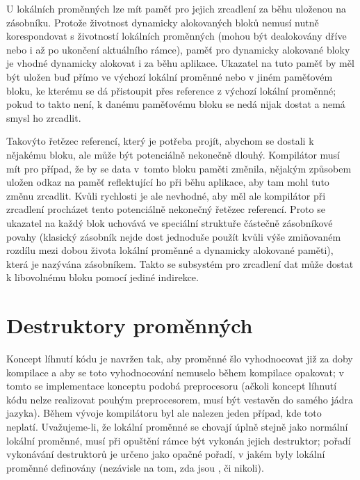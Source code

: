 U lokálních \ctime proměnných lze mít paměť pro jejich zrcadlení za běhu uloženou na zásobníku. Protože životnost dynamicky alokovaných \ctime bloků nemusí nutně korespondovat s životností lokálních proměnných (mohou být dealokovány dříve nebo i až po ukončení aktuálního rámce), paměť pro dynamicky alokované \ctime bloky je vhodné dynamicky alokovat i za běhu aplikace. Ukazatel na tuto paměť by měl být uložen buď přímo ve výchozí \ctime lokální proměnné nebo v jiném paměťovém bloku, ke kterému se dá přistoupit přes reference z výchozí lokální proměnné; pokud to takto není, k danému paměťovému bloku se nedá nijak dostat a nemá smysl ho zrcadlit.

Takovýto řetězec referencí, který je potřeba projít, abychom se dostali k nějakému bloku, ale může být potenciálně nekonečně dlouhý. Kompilátor musí mít pro případ, že by se data v~tomto \ctime bloku paměti změnila, nějakým způsobem uložen odkaz na paměť reflektující ho při běhu aplikace, aby tam mohl tuto změnu zrcadlit. Kvůli rychlosti je ale nevhodné, aby měl ale kompilátor při zrcadlení procházet tento potenciálně nekonečný řetězec referencí. Proto se ukazatel na každý blok uchovává ve speciální struktuře částečně zásobníkové povahy (klasický zásobník nejde dost jednoduše použít kvůli výše zmiňovaném rozdílu mezi dobou života lokální proměnné a dynamicky alokované \ctime paměti), která je nazývána \ctime zásobníkem. Takto se subsystém pro zrcadlení \ctime dat může dostat k libovolnému bloku pomocí jediné indirekce.


\section{Destruktory \ctime proměnných} \label{impl:destructors}
Koncept líhnutí kódu je navržen tak, aby \ctime proměnné šlo vyhodnocovat již za doby kompilace a aby se toto vyhodnocování nemuselo během kompilace opakovat; v tomto se implementace konceptu podobá preprocesoru (ačkoli koncept líhnutí kódu nelze realizovat pouhým preprocesorem, musí být vestavěn do samého jádra jazyka). Během vývoje kompilátoru byl ale nalezen jeden případ, kde toto neplatí. Uvažujeme-li, že lokální \ctime proměnné se chovají úplně stejně jako normální lokální proměnné, musí při opuštění rámce být vykonán jejich destruktor; pořadí vykonávání destruktorů je určeno jako opačné pořadí, v jakém byly lokální proměnné definovány (nezávisle na tom, zda jsou \ctime, či nikoli).

